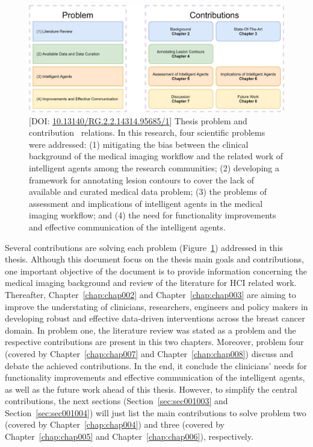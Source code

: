 \begin{figure}[ht]
\centering
\includegraphics[width=\textwidth]{images/fig017}
\caption{[DOI: \protect\href{https://www.doi.org/10.13140/RG.2.2.14314.95685/1}{10.13140/RG.2.2.14314.95685/1}] Thesis problem and contribution~\cite{https://doi.org/10.13140/rg.2.2.14314.95685/1} relations. In this research, four scientific problems were addressed: (1) mitigating the bias between the clinical background of the medical imaging workflow and the related work of intelligent agents among the research communities; (2) developing a framework for annotating lesion contours to cover the lack of available and curated medical data problem; (3) the problems of assessment and implications of intelligent agents in the medical imaging workflow; and (4) the need for functionality improvements and effective communication of the intelligent agents.}
\label{fig:fig017}
\end{figure}

Several contributions are solving each problem (Figure~\ref{fig:fig017}) addressed in this thesis.
Although this document focus on the thesis main goals and contributions, one important objective of the document is to provide information concerning the medical imaging background and review of the literature for \ac{HCI} related work.
Thereafter, Chapter~\ref{chap:chap002} and Chapter~\ref{chap:chap003} are aiming to improve the understating of clinicians, researchers, engineers and policy makers in developing robust and effective data-driven interventions across the breast cancer domain.
In problem one, the literature review was stated as a problem and the respective contributions are present in this two chapters.
Moreover, problem four (covered by Chapter~\ref{chap:chap007} and Chapter~\ref{chap:chap008}) discuss and debate the achieved contributions.
In the end, it conclude the clinicians' needs for functionality improvements and effective communication of the intelligent agents, as well as the future work ahead of this thesis.
However, to simplify the central contributions, the next sections (Section~\ref{sec:sec001003} and Section~\ref{sec:sec001004}) will just list the main contributions to solve problem two (covered by Chapter~\ref{chap:chap004}) and three (covered by Chapter~\ref{chap:chap005} and Chapter~\ref{chap:chap006}), respectively.

